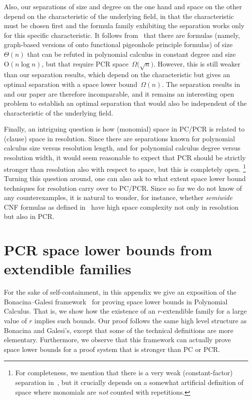 \documentclass[11pt]{article}
\numberwithin{equation}{section}
\theoremstyle{definition}
\theoremstyle{plain}
\theoremstyle{plain}
\theoremstyle{definition}
\newcommand{\bigoh}[1]{\mathrm{O} ( #1 )}
\newcommand{\bigtheta}[1]{\Theta ( #1 )}
\newcommand{\Bigomega}[1]{\Omega \bigl( #1 \bigr)}
\newcommand{\bigomega}[1]{\Omega ( #1 )}
\newcommand{\introduceterm}[1]{{\emph{#1}}}
\newcommand{\kextendiblenot}{r}
\newcommand{\kextendible}{\mbox{$\kextendiblenot$-ex}\-tend\-ible\xspace}
\begin{document}
Also, our separations of size and degree on the one hand and space on
the other depend on the characteristic of the 
underlying field, in that the characteristic must be chosen
first and the formula  family exhibiting the separation works only
for this specific characteristic.
It follows from~\cite{GKT19SpaceWidth} that there are formulas
(namely, graph-based versions of onto functional pigeonhole principle
formulas) of size $\bigtheta{n}$ that can be refuted in polynomial
calculus  in constant degree and size~$\bigoh{n \log n}$,
but that require PCR space~$\Bigomega{\sqrt{n}}$.
However, this is still weaker than our separation results, which
depend on the characteristic but gives an optimal separation with a
space lower bound~$\bigomega{n}$. The separation results
in~\cite{GKT19SpaceWidth} and our paper are therefore incomparable,
and it remains an interesting open problem to establish an optimal
separation that would also be independent of the characteristic of the
underlying field.

Finally, an intriguing question is how (monomial) space in PC/PCR is
related to (clause) space in resolution. Since there are separations
known for polynomial calculus size versus resolution length, and for
polynomial calculus degree versus resolution width, it would seem
reasonable to expect that PCR should be strictly stronger than
resolution also with respect to space, but this is completely open.%
\footnote{%
  For completeness, we mention that there is a very weak
  (constant-factor) separation in~\cite{ABRW02SpaceComplexity}, but it
  crucially depends on a somewhat artificial definition of space where
  monomials are \emph{not} counted with repetitions.}  
%
%
Turning this question around, one can also ask to
what extent space lower bound techniques for
resolution carry over to PC/PCR. Since so far we do not know of any
%
counterexamples, %
it is natural to wonder, for instance, whether
\introduceterm{semiwide} CNF formulas as defined in~%
\cite{ABRW02SpaceComplexity} have high space complexity not only in
resolution but also in PCR.
 
%
%

\appendix
%
\section{PCR space lower bounds from extendible families}
\label{sec:bg-framework}

%
%
%
%
%
For the sake of self-containment, in this appendix we give an
exposition of the Bonacina--Galesi
framework~\cite{BG15Framework} for proving space lower bounds
in Polynomial Calculus. %
That is, we
show how the existence of an
\kextendible family for a large value of $\kextendiblenot{}$
implies such bounds. %
Our proof follows the same high level structure as Bonacina and Galesi's, except that some of the technical definitions are more elementary. Furthermore, we observe that this
framework can actually prove space lower
bounds for a proof system that %
is   %
stronger than PC or PCR.
\end{document}
